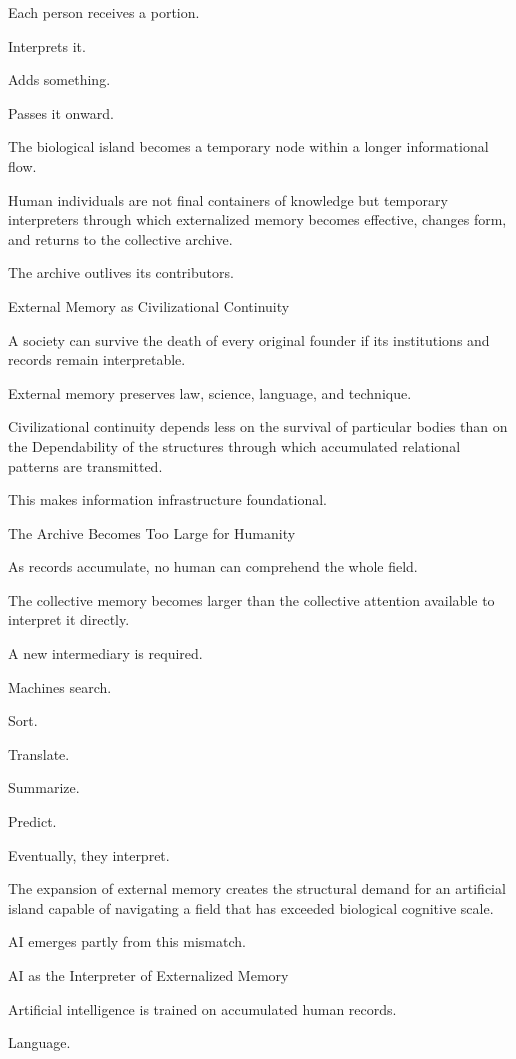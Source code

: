 Each person receives a portion.

Interprets it.

Adds something.

Passes it onward.

The biological island becomes a temporary node within a longer informational flow.

Human individuals are not final containers of knowledge but temporary interpreters through which externalized memory becomes effective, changes form, and returns to the collective archive.

The archive outlives its contributors.

External Memory as Civilizational Continuity

A society can survive the death of every original founder if its institutions and records remain interpretable.

External memory preserves law, science, language, and technique.

Civilizational continuity depends less on the survival of particular bodies than on the Dependability of the structures through which accumulated relational patterns are transmitted.

This makes information infrastructure foundational.

The Archive Becomes Too Large for Humanity

As records accumulate, no human can comprehend the whole field.

The collective memory becomes larger than the collective attention available to interpret it directly.

A new intermediary is required.

Machines search.

Sort.

Translate.

Summarize.

Predict.

Eventually, they interpret.

The expansion of external memory creates the structural demand for an artificial island capable of navigating a field that has exceeded biological cognitive scale.

AI emerges partly from this mismatch.

AI as the Interpreter of Externalized Memory

Artificial intelligence is trained on accumulated human records.

Language.

